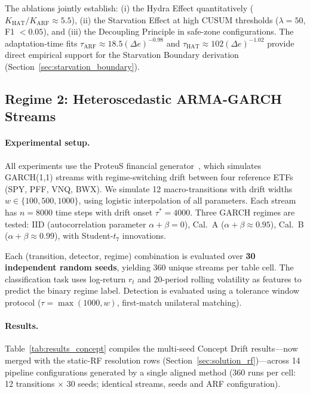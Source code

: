 \documentclass[10pt,conference]{IEEEtran}
\theoremstyle{definition}
\begin{document}
The ablations jointly establish: (i) the Hydra Effect quantitatively ($K_{\mathrm{HAT}}/K_{\mathrm{ARF}} \approx 5.5$), (ii) the Starvation Effect at high CUSUM thresholds ($\lambda = 50$, F1 $< 0.05$), and (iii) the Decoupling Principle in safe-zone configurations. The adaptation-time fits $\tau_{\mathrm{ARF}} \approx 18.5(\Delta e)^{-0.98}$ and $\tau_{\mathrm{HAT}} \approx 102(\Delta e)^{-1.02}$ provide direct empirical support for the Starvation Boundary derivation (Section~\ref{sec:starvation_boundary}).

\subsection{Regime 2: Heteroscedastic ARMA-GARCH Streams}\label{sec:proteus}

\paragraph{Experimental setup.}
All experiments use the ProteuS financial generator~\cite{suarez_cetrulo_proteus_2025}, which simulates GARCH(1,1) streams with regime-switching drift between four reference ETFs (SPY, PFF, VNQ, BWX).
We simulate 12 macro-transitions with drift widths $w \in \{100, 500, 1000\}$, using logistic interpolation of all parameters.
Each stream has $n = 8000$ time steps with drift onset $\tau^* = 4000$.
Three GARCH regimes are tested: IID (autocorrelation parameter $\alpha + \beta = 0$), Cal.~A ($\alpha + \beta \approx 0.95$), Cal.~B ($\alpha + \beta \approx 0.99$), with Student-$t_7$ innovations.

Each (transition, detector, regime) combination is evaluated over \textbf{30 independent random seeds}, yielding 360 unique streams per table cell.
The classification task uses log-return $r_t$ and 20-period rolling volatility as features to predict the binary regime label.
Detection is evaluated using a tolerance window protocol ($\tau = \max(1000, w)$, first-match unilateral matching).

\paragraph{Results.}
Table~\ref{tab:results_concept} compiles the multi-seed Concept Drift results---now merged with the static-RF resolution rows (Section~\ref{sec:solution_rf})---across 14 pipeline configurations generated by a single aligned method (360 runs per cell: 12 transitions $\times$ 30 seeds; identical streams, seeds and ARF configuration).
\end{document}
